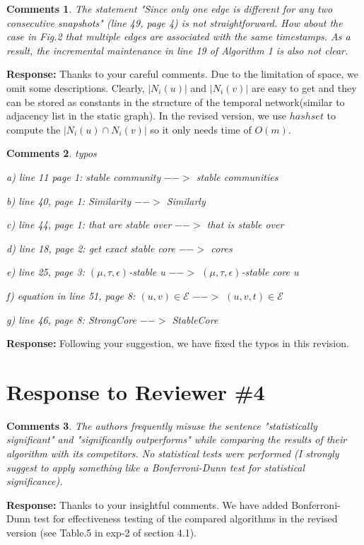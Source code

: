 \documentclass{article}
\newtheorem{Comments}{\textbf{Comments}}
\begin{document}
\begin{Comments}
The statement "Since only one edge is different for any two consecutive snapshots" (line 49, page 4) is not straightforward. How about the case in Fig.2 that multiple edges are associated with the same timestamps. As a result, the incremental maintenance in line 19 of Algorithm 1 is also not clear.
\end{Comments}
\noindent \textbf{Response: } Thanks to your careful comments. Due to the limitation of space, we omit some descriptions. Clearly, $|N_i(u)|$ and $|N_i(v)|$ are easy to get and they can be stored as constants in the structure of the temporal network(similar to adjacency list in the static graph). In the revised version, we use $hashset$ to compute the $|N_i(u) \cap N_i(v)|$ so it only needs time of $O(m)$. 


\begin{Comments}
 typos
 
a) line 11 page 1: stable community $-->$ stable communities

b) line 40, page 1: Similarity $-->$ Similarly

c) line 44, page 1: that are stable over $-->$ that is stable over

d) line 18, page 2: get exact stable core $-->$ cores

e) line 25, page 3: $(\mu, \tau, \epsilon)$-stable u $-->$ $(\mu, \tau, \epsilon)$-stable core u

f) equation in line 51, page 8: $(u, v)\in \mathcal{E}$ $-->$ $(u, v, t)\in \mathcal{E}$

g) line 46, page 8: StrongCore $-->$ StableCore

\end{Comments}
\noindent \textbf{Response: } Following your suggestion, we have fixed the typos in this revision.


\section{Response to Reviewer \#4 }
\setcounter{Comments}{0}
\begin{Comments}
The authors frequently misuse the sentence "statistically significant" and "significantly outperforms" while comparing the results of their algorithm with its competitors. No statistical tests were performed (I strongly suggest to apply something like a Bonferroni-Dunn test for statistical significance).
	
\end{Comments}
\noindent \textbf{Response: } Thanks to your insightful comments. We have added Bonferroni-Dunn test for effectiveness testing of the compared algorithms in the revised version (see Table.5 in exp-2 of section 4.1).
\end{document}
